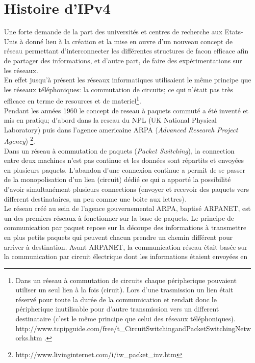 \section{Histoire d'IPv4}
\label{sec:hist}

Une forte demande de la part des universités et centres de recherche aux
Etats-Unis à donné lieu à la création et la mise en ouvre d'un nouveau concept
de réseau permettant d'interconnecter les différentes structures de facon
efficace afin de partager des informations, et d'autre part, de faire des
expérimentations sur les réseaux.
\\
En effet jusqu'à présent les réseaux informatiques utilisaient le même principe que les
réseaux téléphoniques: la commutation de circuits; ce qui n'était pas très 
efficace en terme de resources et de materiel\footnote {
Dans un réseau à commutation de circuits chaque péripherique pouvaient utiliser
un seul lien à la fois (ciruit). Lors d'une trasmission un lien était réservé
pour toute la durée de la communication et rendait donc le péripherique
inutilisable pour d'autre transmission vers un different destinataire (c'est le même
principe que celui des réseaux téléphoniques).
http://www.tcpipguide.com/free/t\_CircuitSwitchingandPacketSwitchingNetworks.htm .}.
\\
Pendant les années 1960 le concept de reseau à paquets commuté a été inventé et mis en 
pratiqu; d'abord dans la reseau du NPL (UK National Physical Laboratory)
puis dans l'agence americaine ARPA ({\it Advanced Research Project Agency})
\footnote {http://www.livinginternet.com/i/iw\_packet\_inv.htm}.
\\
Dans un réseau à commutation de paquets ({\it Packet Switching}), la connection
entre deux machines n'est pas continue et les données sont répartits et
envoyées en plusieurs paquets.  L'abandon d'une connexion continue a permit de
se passer de la monopolisation d'un lien (circuit) dédié ce qui a apporté la
possibilité d'avoir simultanément plusieurs connections (envoyer et recevoir
des paquets vers different destinataires, un peu comme une boite aux lettres). 
\\
Le réseau créé au sein de l'agence gouvernemental ARPA, baptisé ARPANET, est un
des premiers réseaux à fonctionner sur la base de paquets. Le principe de
communication par paquet repose sur la découpe des informations à transmettre en plus
petits paquets qui peuvent chacun prendre un chemin différent pour arriver à
destination.  Avant ARPANET, la communication réseau était basée sur la
communication par circuit électrique dont les informations étaient envoyées en
